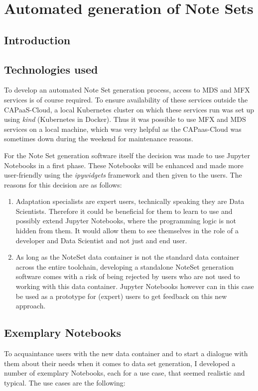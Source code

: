 \chapter{Automated generation of Note Sets}
\label{chap:nsgeneration}

\section{Introduction}
\section{Technologies used}
To develop an automated Note Set generation process, access to MDS and MFX services is of course required. To ensure availability of these services outside the CAPaaS-Cloud, a local Kubernetes cluster on which these services run was set up using \emph{kind} (Kubernetes in Docker). Thus it was possible to use MFX and MDS services on a local machine, which was very helpful as the CAPaas-Cloud was sometimes down during the weekend for maintenance reasons.\par
For the Note Set generation software itself the decision was made to use Jupyter Notebooks in a first phase. These Notebooks will be enhanced and made more user-friendly using the \emph{ipywidgets} framework and then given to the users. The reasons for this decision are as follows:
\begin{enumerate}
  \item Adaptation specialists are expert users, technically speaking they are Data Scientists. Therefore it could be beneficial for them to learn to use and possibly extend Jupyter Notebooks, where the programming logic is not hidden from them. It would allow them to see themselves in the role of a developer and Data Scientist and not just and end user. 
  \item As long as the NoteSet data container is not the standard data container across the entire toolchain, developing a standalone NoteSet generation software comes with a risk of being rejected by users who are not used to working with this data container. Jupyter Notebooks however can in this case be used as a prototype for (expert) users to get feedback on this new approach.
\end{enumerate}
\section{Exemplary Notebooks}
To acquaintance users with the new data container and to start a dialogue with them about their needs when it comes to data set generation, I developed a number of exemplary Notebooks, each for a use case, that seemed realistic and typical. The use cases are the following:
